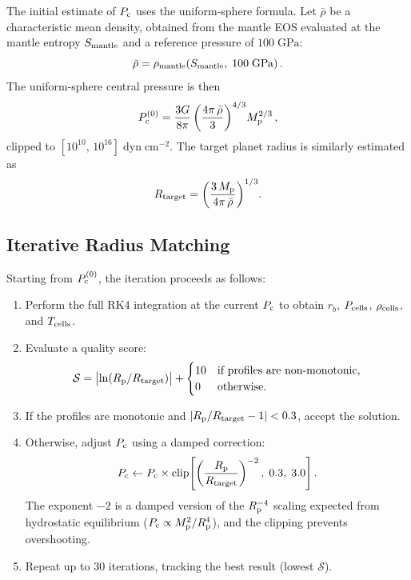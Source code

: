 \documentclass{aastex631}
\newcommand{\Mpl}{M_{\rm p}}
\newcommand{\Rpl}{R_{\rm p}}
\newcommand{\Pc}{P_{\rm c}}
\begin{document}
The initial estimate of $\Pc$ uses the uniform-sphere formula.  Let
$\bar{\rho}$ be a characteristic mean density, obtained from the mantle
EOS evaluated at the mantle entropy $S_{\rm mantle}$ and a reference
pressure of $100\;\mathrm{GPa}$:
\begin{equation}\label{eq:rhobar}
  \bar{\rho} = \rho_{\rm mantle}(S_{\rm mantle},\;100\;\mathrm{GPa})\,.
\end{equation}
The uniform-sphere central pressure is then
\begin{equation}\label{eq:Pc_est}
  \Pc^{(0)} = \frac{3G}{8\pi}
    \left(\frac{4\pi\,\bar{\rho}}{3}\right)^{4/3}\!\Mpl^{2/3}\,,
\end{equation}
clipped to $[10^{10},\,10^{16}]\;\mathrm{dyn\;cm^{-2}}$.  The target
planet radius is similarly estimated as
\begin{equation}\label{eq:R_target}
  R_{\rm target} = \left(\frac{3\,\Mpl}
    {4\pi\,\bar{\rho}}\right)^{1/3}\!.
\end{equation}

\subsection{Iterative Radius Matching}

Starting from $\Pc^{(0)}$, the iteration proceeds as follows:
\begin{enumerate}
  \item Perform the full RK4 integration at the current $\Pc$ to obtain
    $r_b$, $P_{\rm cells}$, $\rho_{\rm cells}$, and $T_{\rm cells}$.
  \item Evaluate a quality score:
    \begin{equation}\label{eq:score}
      \mathcal{S} = \bigl|\ln(\Rpl / R_{\rm target})\bigr|
        + \begin{cases} 10 & \text{if profiles are non-monotonic,} \\
                         0  & \text{otherwise.}\end{cases}
    \end{equation}
  \item If the profiles are monotonic and $|\Rpl / R_{\rm target} - 1|
    < 0.3$, accept the solution.
  \item Otherwise, adjust $\Pc$ using a damped correction:
    \begin{equation}\label{eq:Pc_update}
      \Pc \gets \Pc \times
        \mathrm{clip}\!\left[\left(\frac{\Rpl}{R_{\rm target}}
        \right)^{-2},\;0.3,\;3.0\right].
    \end{equation}
    The exponent $-2$ is a damped version of the $\Rpl^{-4}$ scaling
    expected from hydrostatic equilibrium ($\Pc \propto \Mpl^{2} /
    \Rpl^{4}$), and the clipping prevents overshooting.
  \item Repeat up to 30 iterations, tracking the best result (lowest
    $\mathcal{S}$).
\end{enumerate}
\end{document}
